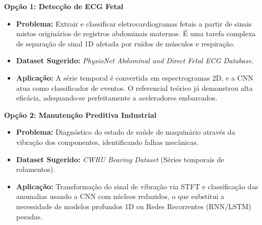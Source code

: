 \documentclass[12pt,a4paper]{article}
\begin{document}
\vspace{0.5em}
\noindent \textbf{Opção 1: Detecção de ECG Fetal}
\begin{itemize}
    \item \textbf{Problema:} Extrair e classificar eletrocardiogramas fetais a partir de sinais mistos originários de registros abdominais maternos. É uma tarefa complexa de separação de sinal 1D afetada por ruídos de músculos e respiração.
    \item \textbf{Dataset Sugerido:} \textit{PhysioNet Abdominal and Direct Fetal ECG Database}.
    \item \textbf{Aplicação:} A série temporal é convertida em espectrogramas 2D, e a CNN atua como classificador de eventos. O referencial teórico já demonstrou alta eficácia, adequando-se perfeitamente a aceleradores embarcados.
\end{itemize}

\vspace{0.5em}
\noindent \textbf{Opção 2: Manutenção Preditiva Industrial}
\begin{itemize}
    \item \textbf{Problema:} Diagnóstico do estado de saúde de maquinário através da vibração dos componentes, identificando falhas mecânicas.
    \item \textbf{Dataset Sugerido:} \textit{CWRU Bearing Dataset} (Séries temporais de rolamentos).
    \item \textbf{Aplicação:} Transformação do sinal de vibração via STFT e classificação das anomalias usando a CNN com núcleos reduzidos, o que substitui a necessidade de modelos profundos 1D ou Redes Recorrentes (RNN/LSTM) pesadas.
\end{itemize}
\end{document}
